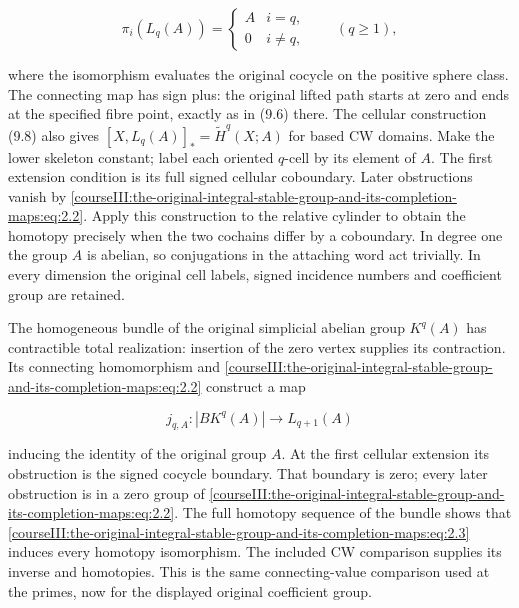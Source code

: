 \begin{equation}
\pi_i(L_q(A))=
 \begin{cases}A&i=q,\\0&i\ne q,\end{cases}
 \qquad(q\geq1),
 \label{courseIII:the-original-integral-stable-group-and-its-completion-maps:eq:2.2}
\end{equation}

where the isomorphism evaluates the original cocycle on the positive sphere class. The connecting map has sign plus: the original lifted path starts at zero and ends at the specified fibre point, exactly as in (9.6) there. The cellular construction (9.8) also gives \([X,L_q(A)]_* =\widetilde H^q(X;A)\) for based CW domains. Make the lower skeleton constant; label each oriented \(q\)-cell by its element of \(A\). The first extension condition is its full signed cellular coboundary. Later obstructions vanish by \eqref{courseIII:the-original-integral-stable-group-and-its-completion-maps:eq:2.2}. Apply this construction to the relative cylinder to obtain the homotopy precisely when the two cochains differ by a coboundary. In degree one the group \(A\) is abelian, so conjugations in the attaching word act trivially. In every dimension the original cell labels, signed incidence numbers and coefficient group are retained.

The homogeneous bundle of the original simplicial abelian group \(K^q(A)\) has contractible total realization: insertion of the zero vertex supplies its contraction. Its connecting homomorphism and \eqref{courseIII:the-original-integral-stable-group-and-its-completion-maps:eq:2.2} construct a map

\begin{equation}
j_{q,A}:|BK^q(A)|\longrightarrow L_{q+1}(A)
 \label{courseIII:the-original-integral-stable-group-and-its-completion-maps:eq:2.3}
\end{equation}

inducing the identity of the original group \(A\). At the first cellular extension its obstruction is the signed cocycle boundary. That boundary is zero; every later obstruction is in a zero group of \eqref{courseIII:the-original-integral-stable-group-and-its-completion-maps:eq:2.2}. The full homotopy sequence of the bundle shows that \eqref{courseIII:the-original-integral-stable-group-and-its-completion-maps:eq:2.3} induces every homotopy isomorphism. The included CW comparison supplies its inverse and homotopies. This is the same connecting-value comparison used at the primes, now for the displayed original coefficient group.

